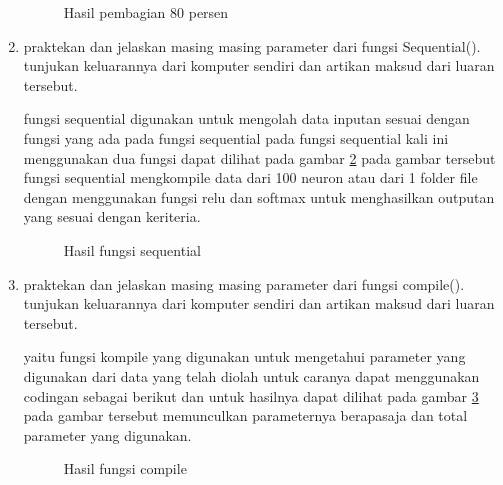 \begin{enumerate}
\begin{figure}[!htbp]
      \caption{Hasil pembagian 80 persen}
      \label{c125}
      \end{figure}

\item praktekan dan jelaskan masing masing parameter dari fungsi Sequential().  tunjukan keluarannya dari komputer sendiri dan artikan maksud dari luaran tersebut.\par
\subitem fungsi sequential digunakan untuk mengolah data inputan sesuai dengan fungsi yang ada pada fungsi sequential pada fungsi sequential kali ini menggunakan dua fungsi dapat dilihat pada gambar \ref{c126} pada gambar tersebut fungsi sequential mengkompile data dari 100 neuron atau dari 1 folder file dengan menggunakan fungsi relu dan softmax untuk menghasilkan outputan yang sesuai dengan keriteria.


\begin{figure}[!htbp]
      \caption{Hasil fungsi sequential}
      \label{c126}
      \end{figure}

\item praktekan dan jelaskan masing masing parameter dari fungsi compile().  tunjukan keluarannya dari komputer sendiri dan artikan maksud dari luaran tersebut. \par
\subitem yaitu fungsi kompile yang digunakan untuk mengetahui parameter yang digunakan dari data yang telah diolah untuk caranya dapat menggunakan codingan sebagai berikut dan untuk hasilnya dapat dilihat pada gambar \ref{c127} pada gambar tersebut memunculkan parameternya berapasaja dan total parameter yang digunakan.



\begin{figure}[!htbp]
      \caption{Hasil fungsi compile}
      \label{c127}
      \end{figure}


\end{enumerate}
